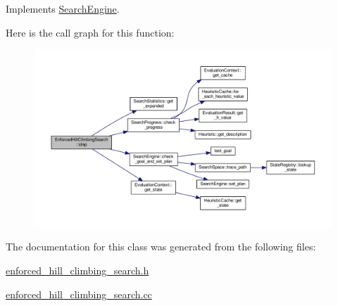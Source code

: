 Implements \hyperlink{classSearchEngine_a2c003ac4636fd1442fd2d4eb8db5ab8d}{Search\-Engine}.



Here is the call graph for this function\-:
\nopagebreak
\begin{figure}[H]
\begin{center}
\leavevmode
\includegraphics[width=350pt]{classEnforcedHillClimbingSearch_a792b3c175edfe829dd67401eb1060fce_cgraph}
\end{center}
\end{figure}




The documentation for this class was generated from the following files\-:\begin{DoxyCompactItemize}
\item 
\hyperlink{enforced__hill__climbing__search_8h}{enforced\-\_\-hill\-\_\-climbing\-\_\-search.\-h}\item 
\hyperlink{enforced__hill__climbing__search_8cc}{enforced\-\_\-hill\-\_\-climbing\-\_\-search.\-cc}\end{DoxyCompactItemize}
